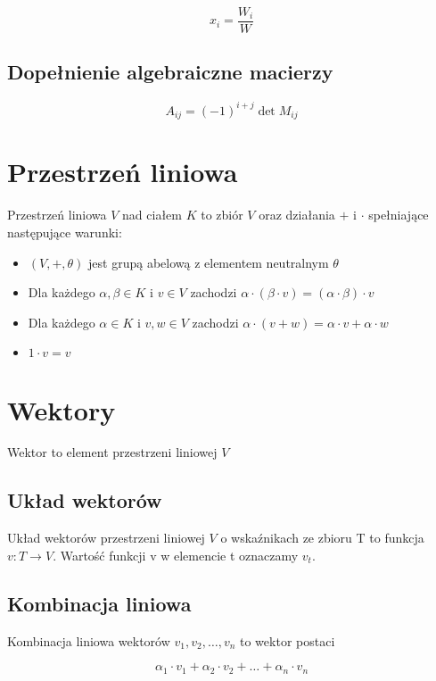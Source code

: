 \documentclass{../notatki}
\begin{document}
$$
x_i = \frac{W_i}{W}
$$

\subsection{Dopełnienie algebraiczne macierzy}

$$
A_{ij} = (-1)^{i + j} \det M_{ij}
$$

\section{Przestrzeń liniowa}

Przestrzeń liniowa $V$ nad ciałem $K$ to zbiór $V$ oraz działania $+$
i $\cdot$ spełniające następujące warunki:

\begin{itemize}
  \item $(V, +, \theta)$ jest grupą abelową z elementem neutralnym $\theta$
  \item Dla każdego $\alpha, \beta \in K$ i $v \in V$ zachodzi
    $\alpha \cdot (\beta \cdot v) = (\alpha \cdot \beta) \cdot v$
  \item Dla każdego $\alpha \in K$ i $v, w \in V$ zachodzi $\alpha
    \cdot (v + w) = \alpha \cdot v + \alpha \cdot w$
  \item $1 \cdot v = v$
\end{itemize}

\section{Wektory}

Wektor to element przestrzeni liniowej $V$

\subsection{Układ wektorów}

Układ wektorów przestrzeni liniowej $V$ o wskaźnikach ze zbioru T to
funkcja $v: T \rightarrow V$. Wartość funkcji v w elemencie t oznaczamy $v_t$.

\subsection{Kombinacja liniowa}

Kombinacja liniowa wektorów $v_1, v_2, \dots, v_n$ to wektor postaci

$$
\alpha_1 \cdot v_1 + \alpha_2 \cdot v_2 + \dots + \alpha_n \cdot v_n
$$
\end{document}
